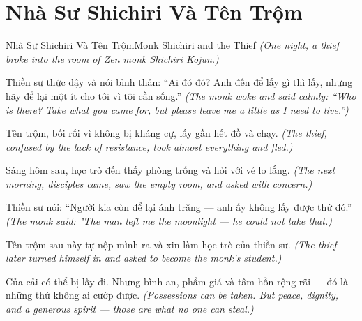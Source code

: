 \section{Nhà Sư Shichiri Và Tên Trộm}
\begin{truyen}{Nhà Sư Shichiri Và Tên Trộm}{Monk Shichiri and the Thief}
\textit{(One night, a thief broke into the room of Zen monk Shichiri Kojun.)}

Thiền sư thức dậy và nói bình thản: ``Ai đó đó? Anh đến để lấy gì thì lấy, nhưng hãy để lại một ít cho tôi vì tôi cần sống.''
\textit{(The monk woke and said calmly: ``Who is there? Take what you came for, but please leave me a little as I need to live.'')}

Tên trộm, bối rối vì không bị kháng cự, lấy gần hết đồ và chạy.
\textit{(The thief, confused by the lack of resistance, took almost everything and fled.)}

Sáng hôm sau, học trò đến thấy phòng trống và hỏi với vẻ lo lắng.
\textit{(The next morning, disciples came, saw the empty room, and asked with concern.)}

Thiền sư nói: ``Người kia còn để lại ánh trăng — anh ấy không lấy được thứ đó.''
\textit{(The monk said: "The man left me the moonlight — he could not take that.)}

Tên trộm sau này tự nộp mình ra và xin làm học trò của thiền sư.
\textit{(The thief later turned himself in and asked to become the monk's student.)}

\end{truyen}

\begin{baihoc}
Của cải có thể bị lấy đi. Nhưng bình an, phẩm giá và tâm hồn rộng rãi — đó là những thứ không ai cướp được.
\textit{(Possessions can be taken. But peace, dignity, and a generous spirit — those are what no one can steal.)}
\end{baihoc}
\ngancach

